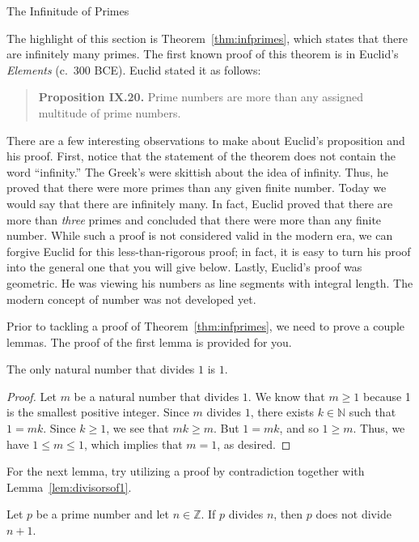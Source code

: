 \begin{section}{The Infinitude of Primes}

The highlight of this section is Theorem~\ref{thm:infprimes}, which states that there are infinitely many primes. The first known proof of this theorem is in Euclid's \emph{Elements} (c.\ 300 BCE). Euclid stated it as follows: 
\begin{quote}
\textbf{Proposition IX.20.} Prime numbers are more than any assigned multitude of prime numbers.
\end{quote}
There are a few interesting observations to make about Euclid's proposition and his proof. First, notice that the statement of the theorem does not contain the word ``infinity.'' The Greek's were skittish about the idea of infinity. Thus, he proved that there were more primes than any given finite number. Today we would say that there are infinitely many. In fact, Euclid proved that there are more than \emph{three} primes and concluded that there were more than any finite number. While such a proof is not considered valid in the modern era, we can forgive Euclid for this less-than-rigorous proof;  in fact, it is easy to turn his proof into the general one that you will give below. Lastly, Euclid's proof was geometric. He was viewing his numbers as line segments with integral length. The modern concept of number was not developed yet.

Prior to tackling a proof of Theorem~\ref{thm:infprimes}, we need to prove a couple lemmas.  The proof of the first lemma is provided for you. 

\begin{lemma}\label{lem:divisorsof1}
The only natural number that divides $1$ is $1$.  
\end{lemma}

\begin{proof}
Let $m$ be a natural number that divides $1$. We know that $m\geq 1$ because 1 is the smallest positive integer. Since $m$ divides $1$, there exists $k\in \mathbb{N}$ such that $1=mk$. Since $k\geq 1$, we see that $mk\geq m$.  But $1=mk$, and so $1\geq m$.  Thus, we have $1\leq m \leq 1$, which implies that $m=1$, as desired.
\end{proof}

For the next lemma, try utilizing a proof by contradiction together with Lemma~\ref{lem:divisorsof1}.

\begin{lemma}\label{lem:plus1}
Let $p$ be a prime number and let $n\in \mathbb{Z}$. If $p$ divides $n$, then $p$ does not divide $n+1$.
\end{lemma}


\end{section}
